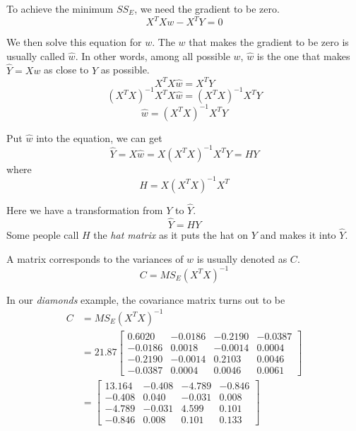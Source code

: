 \documentclass[
	letterpaper
]{article}
\begin{document}
To achieve the minimum $SS_E$, we need the gradient to be zero.
\begin{equation}
X^T X w - X^T Y = 0
\end{equation}

We then solve this equation for $w$.
The $w$ that makes the gradient to be zero is usually called $\hat w$.
In other words, among all possible $w$, $\hat w$ is the one that makes $\hat Y = Xw$ as close to $Y$ as possible.
\begin{equation}
X^T X \hat w = X^T Y
\end{equation}
\begin{equation}
 (X^T X)^{-1} X^T X \hat w= (X^T X)^{-1} X^T Y
\end{equation}
\begin{equation}
\hat w= (X^T X)^{-1}X^T Y
\end{equation}


Put $\hat w$ into the equation, we can get
\begin{equation}
\hat Y = X\hat w= X(X^T X)^{-1}X^T Y=HY
\end{equation}
where
\begin{equation}
H= X(X^T X)^{-1}X^T
\end{equation}

Here we have a transformation from $Y$ to $\hat Y$.
\begin{equation}
\hat Y  = HY
\end{equation}
Some people call $H$ the \textit{hat matrix} as it puts the hat on $Y$ and makes it into $\hat Y$.

A matrix corresponds to the variances of $w$ is usually denoted as $C$.
\begin{equation}
C = MS_E (X^T X)^{-1}
\end{equation}

In our \textit{diamonds} example, the covariance matrix turns out to be
\begin{equation}
\begin{split}
C &= MS_E (X^T X)^{-1}\\
& = 21.87
\begin{bmatrix}
0.6020 & -0.0186 & -0.2190 & -0.0387\\
-0.0186 & 0.0018 & -0.0014 & 0.0004\\
-0.2190 & -0.0014 & 0.2103 & 0.0046\\
-0.0387 & 0.0004 & 0.0046 & 0.0061
\end{bmatrix}\\
& = 
\begin{bmatrix}
13.164 & -0.408 & -4.789 & -0.846\\
-0.408 & 0.040 & -0.031 & 0.008\\
-4.789& -0.031 & 4.599 & 0.101\\
-0.846 & 0.008 & 0.101 & 0.133
\end{bmatrix}\\
\end{split}
\end{equation}
\end{document}
